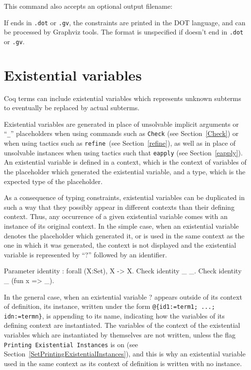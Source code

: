 This command also accepts an optional output filename:
\begin{quote}
{}
\end{quote}
If {\str} ends in \texttt{.dot} or \texttt{.gv}, the constraints are
printed in the DOT language, and can be processed by Graphviz
tools. The format is unspecified if {\str} doesn't end in
\texttt{.dot} or \texttt{.gv}.

\section[Existential variables]{Existential variables\label{ExistentialVariables}}
\label{evars}

Coq terms can include existential variables which
represents unknown subterms to eventually be replaced by actual
subterms.

Existential variables are generated in place of unsolvable implicit
arguments or ``{\tt \_}'' placeholders when using commands such as
\texttt{Check} (see Section~\ref{Check}) or when using tactics such as
\texttt{refine}~(see Section~\ref{refine}), as well as in place of unsolvable
instances when using tactics such that \texttt{eapply} (see
Section~\ref{eapply}). An existential variable is defined in a
context, which is the context of variables of the placeholder which
generated the existential variable, and a type, which is the expected
type of the placeholder. 

As a consequence of typing constraints, existential variables can be
duplicated in such a way that they possibly appear in different
contexts than their defining context. Thus, any occurrence of a given
existential variable comes with an instance of its original context. In the
simple case, when an existential variable denotes the placeholder
which generated it, or is used in the same context as the one in which
it was generated, the context is not displayed and the existential
variable is represented by ``?'' followed by an identifier.

\begin{coq_example}
Parameter identity : forall (X:Set), X -> X.
Check identity _ _.
Check identity _ (fun x => _).
\end{coq_example}

In the general case, when an existential variable ?{\ident}
appears outside of its context of definition, its instance, written under
the form \verb!@{id1:=term1; ...; idn:=termn}!, is appending to its
name, indicating how the variables of its defining context are
instantiated.  The variables of the context of the existential
variables which are instantiated by themselves are not written, unless
the flag {\tt Printing Existential Instances} is on (see
Section~\ref{SetPrintingExistentialInstances}), and this is why an
existential variable used in the same context as its context of
definition is written with no instance.

